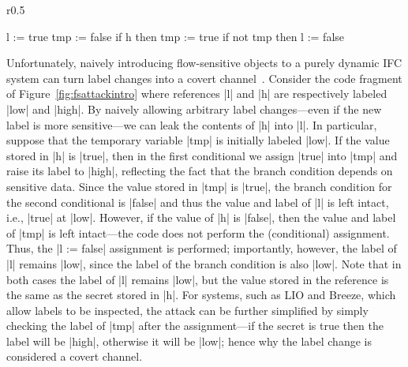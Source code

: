 \begin{wrapfigure}{r}{0.5\columnwidth}
\vspace{-15pt}
  \small
\begin{code}
l    := true
tmp  := false
if h then tmp := true
if not tmp then l := false
\end{code}
\vspace{-15pt}
\caption{\small\label{fig:fsattackintro} Flow-sensitive attack}
\end{wrapfigure}
%
Unfortunately, naively introducing flow-sensitive objects to a purely dynamic
IFC system can turn label changes into a covert channel~\cite{Russo:2010}. 
%
Consider the code fragment of Figure~\ref{fig:fsattackintro}
where references |l| and |h| are respectively labeled |low| and
|high|.
%
By naively allowing arbitrary label changes---even if the new label is
more sensitive---we can leak the contents of |h| into |l|.
%
In particular, suppose that the temporary variable |tmp| is initially
labeled |low|.
%
If the value stored in |h| is |true|, then in the first conditional we
assign |true| into |tmp| and raise its label to |high|, reflecting the
fact that the branch condition depends on sensitive data.
%
Since the value stored in |tmp| is |true|, the branch condition for
the second conditional is |false| and thus the value and label of |l|
is left intact, i.e., |true| at |low|.
%
However, if the value of |h| is |false|, then the value and label of
|tmp| is left intact---the code does not perform the (conditional)
assignment.
%
Thus, the |l := false| assignment is performed; importantly, however,
the label of |l| remains |low|, since the label of the branch
condition is also |low|.
%
Note that in both cases the label of |l| remains |low|, but the value
stored in the reference is the same as the secret stored in |h|.
%
For systems, such as LIO and Breeze, which allow labels to be inspected, the
attack can be further simplified by simply checking the label of |tmp| after
the assignment---if the secret is true then the label will be |high|, otherwise
it will be |low|; hence why the label change is considered a covert channel.

